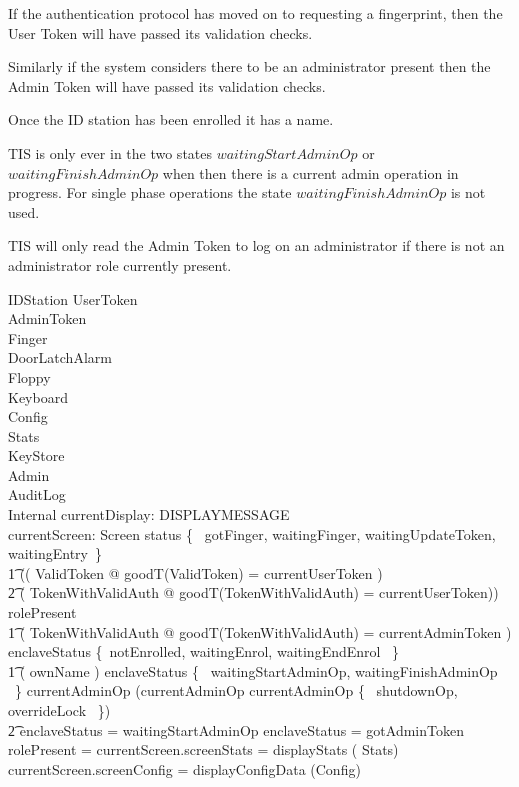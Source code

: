 If the authentication protocol has moved on to requesting a fingerprint,
then the User Token will have passed its validation checks.

Similarly if the system considers there to be an administrator present
then the Admin Token will have passed its validation checks.

Once the ID station has been enrolled it has a name.

TIS is only ever in the two states $waitingStartAdminOp$ or
$waitingFinishAdminOp$ when then there is a current admin operation in
progress. For single phase operations the state
$waitingFinishAdminOp$ is not used.

TIS will only read the Admin Token to log on an administrator if there
is not an administrator role currently present.
 
\begin{schema}{IDStation}
	UserToken
\\	AdminToken
\\	Finger
\\	DoorLatchAlarm
\\      Floppy
\\      Keyboard
\\      Config
\\      Stats
\\      KeyStore
\\      Admin
\\      AuditLog
\\      Internal
\also
	currentDisplay: DISPLAYMESSAGE
\\      currentScreen: Screen
\where
	status \in \{~ gotFinger, waitingFinger, waitingUpdateToken, waitingEntry~\} \implies
\\ \t1		 (( \exists ValidToken @ 
			goodT(\theta ValidToken) = currentUserToken )
\\ \t2  \lor ( \exists TokenWithValidAuth @ 
			goodT(\theta TokenWithValidAuth) = currentUserToken))
\also
        rolePresent \neq \Nil \implies       
\\ \t1		 ( \exists TokenWithValidAuth @ 
			goodT(\theta TokenWithValidAuth) = currentAdminToken )
\also
        enclaveStatus \notin \{~notEnrolled, waitingEnrol, waitingEndEnrol ~\} \implies       
\\ \t1          ( ownName \neq \Nil )
\also
        enclaveStatus \in \{~ waitingStartAdminOp, waitingFinishAdminOp ~\} \iff currentAdminOp \neq \Nil
\also
       (currentAdminOp \neq \Nil \land \The currentAdminOp \in \{~
shutdownOp, overrideLock ~\}) 
\\ \t2          \implies enclaveStatus = waitingStartAdminOp
\also
        enclaveStatus = gotAdminToken \implies rolePresent = \Nil
\also   %
        currentScreen.screenStats = displayStats (\theta
        Stats)
\\      currentScreen.screenConfig = displayConfigData (\theta Config)
\end{schema}
